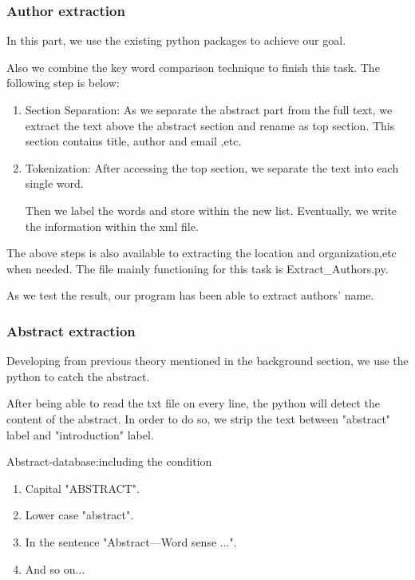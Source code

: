 \subsubsection{Author extraction}

In this part, we use the existing python packages to achieve our goal.

Also we combine the key word comparison technique to finish this task.
The following step is below:

\begin{enumerate}
	
	\item Section Separation: As we separate the abstract part from the full text, we extract the text above the 
	abstract section and rename as top section. 
	This section contains title, author and email ,etc.
	\item Tokenization: After accessing the top section, we separate the text into each single word. 

	Then we label the words and store within the new list. 
	Eventually, we write the information within the xml file. 
	
\end{enumerate}

The above steps is also available to extracting the location and organization,etc 
when needed. 
The file mainly functioning for this task is Extract\_Authors.py.

As we test the result, our program has been able to extract authors' name.

\subsubsection{Abstract extraction}

Developing from previous theory mentioned in the background section, 
we use the python to catch the abstract.


After being able to read the txt file on every line, 
the python will detect the content of the abstract.
In order to do so, we strip the text between "abstract" label and "introduction" label.	


Abstract-database:including the condition

\begin{enumerate}
	
	\item Capital         "ABSTRACT".
	\item Lower case      "abstract".
	\item In the sentence "Abstract—Word sense ...".
	\item And so on...
	
\end{enumerate}

